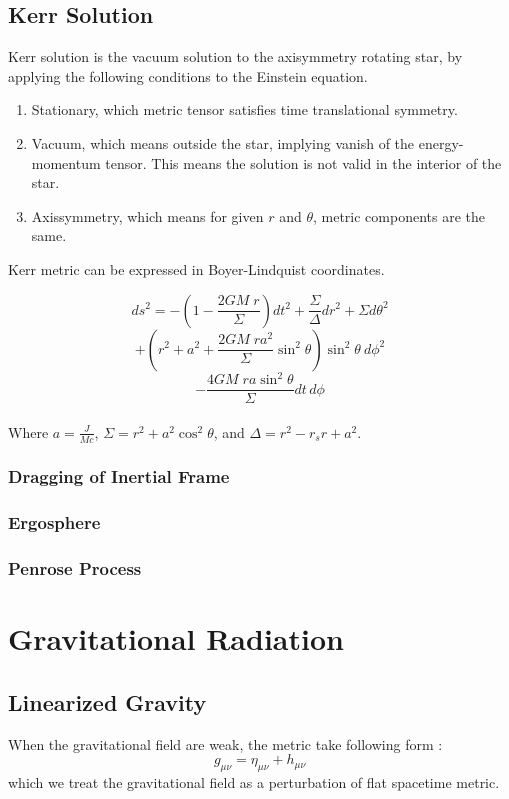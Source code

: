 \documentclass[12pt]{article}
\theoremstyle{mystyle}{\newtheorem{definition}{Definition}[section]}
\theoremstyle{mystyle}{\newtheorem{theorem}[definition]{Theorem}}
\theoremstyle{mystyle}{\newtheorem*{remark}{Remark}}
\theoremstyle{mystyle}{\newtheorem*{example}{Example}}
\theoremstyle{mystyle}{\newtheorem*{examples}{Examples}}
\theoremstyle{cstyle}{\newtheorem*{cthm}{}}
\begin{document}
\subsection{Kerr Solution}
Kerr solution is the vacuum solution to the axisymmetry rotating star, by applying the following conditions to the Einstein equation.
\begin{enumerate}
  \item Stationary, which metric tensor satisfies time translational symmetry.
  \item Vacuum, which means outside the star, implying vanish of the energy-momentum tensor. This means the solution is not valid in the interior of the star.
  \item Axissymmetry, which means for given \(r\) and \(\theta\), metric components are the same.
\end{enumerate}
Kerr metric can be expressed in Boyer-Lindquist coordinates.
\begin{cthm}
  \[ds^{2} =
    -\left( 1 - \frac{2GM\; r}{\Sigma} \right) dt^{2} + \frac{\Sigma}{\Delta} dr^{2} + \Sigma d\theta^{2}
  \] \[+\left(r^2+ a^2 + \frac{2GM\; r a^{2}}{\Sigma} \sin^{2}\theta \right) \sin^{2}\theta \ d\phi^{2}\]
  \[ -\frac{4GM\; ra \sin^{2} \theta}{\Sigma} dt \, d\phi\]\\
  Where \(a = \frac{J}{Mc}\), \(\Sigma = r^{2} + a^{2} \cos^{2}\theta\), and \(\Delta = r^{2} - r_{s} r + a^{2}\).
\end{cthm}

\subsubsection{Dragging of Inertial Frame}

\subsubsection{Ergosphere}

\subsubsection{Penrose Process}

\section{Gravitational Radiation}
\subsection{Linearized Gravity}
When the gravitational field are weak, the metric take following form :\[g_{\mu\nu} = \eta_{\mu\nu} + h_{\mu\nu} \]
which we treat the gravitational field as a perturbation of flat spacetime metric.
\end{document}

